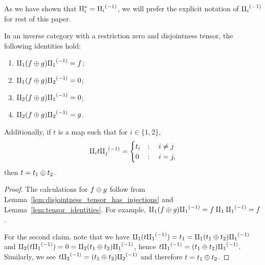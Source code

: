 As we have shown that $\amalg_{i}^{*} = {\amalg_{i}}^{(-1)}$, we will prefer the explicit notation of ${\amalg_{i}}^{(-1)}$ for
rest of this paper.

\begin{corollary}\label{cor:split_plus_tensor}
  In an inverse category \X with a restriction zero and disjointness tensor, the following
  identities hold:
  \begin{multicols}{2}
    \begin{enumerate}[{(}i{)}]
      \item $\amalg_{1} (f \oplus g) {\amalg_{1}}^{(-1)} = f$;
      \item $\amalg_{1} (f\oplus g) {\amalg_{2}}^{(-1)} = 0$;
      \item $\amalg_{2} (f \oplus g) {\amalg_{1}}^{(-1)} = 0$;
      \item $\amalg_{2} (f\oplus g) {\amalg_{2}}^{(-1)} = g$.
    \end{enumerate}
  \end{multicols}
  Additionally, if $t$ is a map such that for $i \in \{1,2\}$,
  \[
    \amalg_{i} t {\amalg_{j}}^{(-1)} =
    \begin{cases}
      t_i& : \quad i \neq j\\
      0 & : \quad i = j,
    \end{cases}
  \]
  then $t = t_1 \oplus t_2$.
\end{corollary}
\begin{proof}
  The calculations for $f\oplus g$ follow from Lemma~\ref{lem:disjointness_tensor_has_injections} and
  Lemma~\ref{lem:tensor_identities}. For example, $\amalg_{1} (f\oplus g) {\amalg_{1}}^{(-1)} = f \amalg_{1} {\amalg_{1}}^{(-1)} = f$.

  For the second claim, note that we have $\amalg_{1} (t {\amalg_{1}}^{(-1)}) = t_1 = \amalg_{1} ( t_1 \oplus t_2){\amalg_{1}}^{(-1)}$ and
  $\amalg_{2}  (t {\amalg_{1}}^{(-1)}) = 0 = \amalg_{2} ( t_1 \oplus t_2){\amalg_{1}}^{(-1)}$, hence $t {\amalg_{1}}^{(-1)} = ( t_1 \oplus t_2){\amalg_{1}}^{(-1)}$. Similarly,
  we see $t{\amalg_{2}}^{(-1)} = ( t_1 \oplus t_2){\amalg_{2}}^{(-1)}$ and therefore $t = t_1 \oplus t_2$.
\end{proof}

